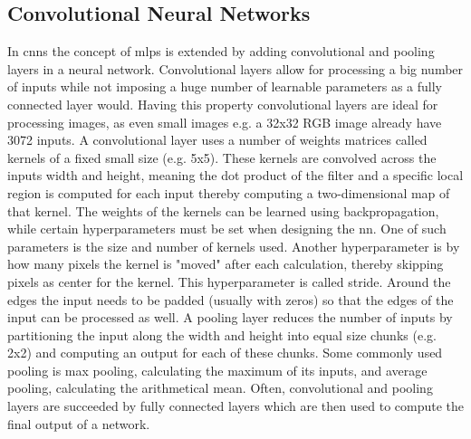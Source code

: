 \subsection{Convolutional Neural Networks}
In \ac{cnn}s the concept of \ac{mlp}s is extended by adding convolutional and pooling layers in a neural network. Convolutional layers allow for processing a big number of inputs while not imposing a huge number of learnable parameters as a fully connected layer would. Having this property convolutional layers are ideal for processing images, as even small images e.g. a 32x32 RGB image already have 3072 inputs.
A convolutional layer uses a number of weights matrices called kernels of a fixed small size (e.g. 5x5). These kernels are convolved across the inputs width and height, meaning the dot product of the filter and a specific local region is computed for each input thereby computing a two-dimensional map of that kernel. The weights of the kernels can be learned using backpropagation, while certain hyperparameters must be set when designing the \ac{nn}. One of such parameters is the size and number of kernels used. Another hyperparameter is by how many pixels the kernel is "moved" after each calculation, thereby skipping pixels as center for the kernel. This hyperparameter is called stride. Around the edges the input needs to be padded (usually with zeros) so that the edges of the input can be processed as well.
A pooling layer reduces the number of inputs by partitioning the input along the width and height into equal size chunks (e.g. 2x2) and computing an output for each of these chunks. Some commonly used pooling is max pooling, calculating the maximum of its inputs, and average pooling, calculating the arithmetical mean.
Often, convolutional and pooling layers are succeeded by fully connected layers which are then used to compute the final output of a network.




%

